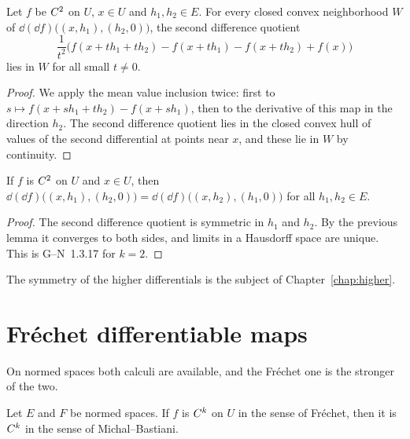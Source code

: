 \begin{lemma}
  \label{lem:second-diff}
  \leanok
  Let $f$ be $C^{2}$ on $U$, $x \in U$ and $h_1, h_2 \in E$. For every closed convex
  neighborhood $W$ of $\dd(\dd f)\bigl((x, h_1), (h_2, 0)\bigr)$, the second difference quotient
  \[
    \frac{1}{t^2}\bigl(f(x + t h_1 + t h_2) - f(x + t h_1) - f(x + t h_2) + f(x)\bigr)
  \]
  lies in $W$ for all small $t \neq 0$.
\end{lemma}

\begin{proof}
  \leanok
  We apply the mean value inclusion twice: first to $s \mapsto f(x + s h_1 + t h_2) - f(x + s h_1)$,
  then to the derivative of this map in the direction $h_2$. The second difference quotient
  lies in the closed convex hull of values of the second differential at points near $x$, and
  these lie in $W$ by continuity.
\end{proof}

\begin{theorem}
  \label{thm:symm2}
  \leanok
  If $f$ is $C^{2}$ on $U$ and $x \in U$, then
  $\dd(\dd f)\bigl((x, h_1), (h_2, 0)\bigr) = \dd(\dd f)\bigl((x, h_2), (h_1, 0)\bigr)$ for all
  $h_1, h_2 \in E$.
\end{theorem}

\begin{proof}
  \leanok
  The second difference quotient is symmetric in $h_1$ and $h_2$. By the previous lemma it
  converges to both sides, and limits in a Hausdorff space are unique. This is G--N~1.3.17 for
  $k = 2$.
\end{proof}

The symmetry of the higher differentials is the subject of Chapter~\ref{chap:higher}.

\section{Fréchet differentiable maps}

On normed spaces both calculi are available, and the Fréchet one is the stronger of the two.

\begin{proposition}
  \label{prop:frechet-to-mb}
  \leanok
  Let $E$ and $F$ be normed spaces. If $f$ is $C^{k}$ on $U$ in the sense of Fréchet, then it
  is $C^{k}$ in the sense of Michal--Bastiani.
\end{proposition}

